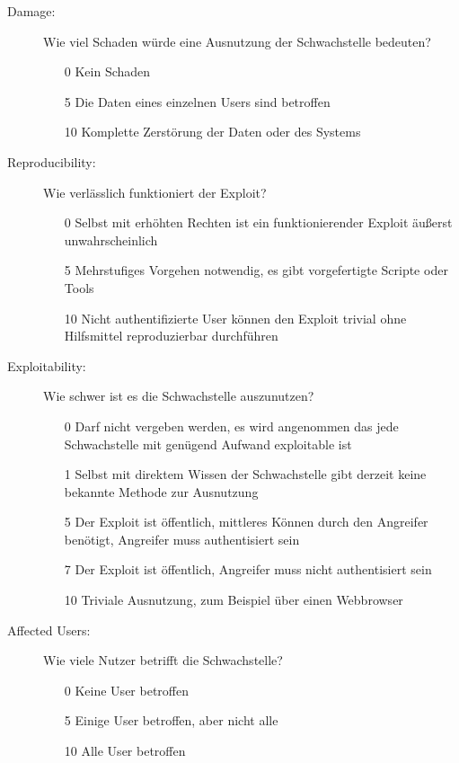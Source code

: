 		\begin{description}
			\item[Damage: ] Wie viel Schaden würde eine Ausnutzung der Schwachstelle bedeuten?
			\begin{itemize}
				\item[0] Kein Schaden
				\item[5] Die Daten eines einzelnen Users sind betroffen
				\item[10] Komplette Zerstörung der Daten oder des Systems 
			\end{itemize}
			
			\item[Reproducibility: ] Wie verlässlich funktioniert der Exploit?
			\begin{itemize}
				\item[0] Selbst mit erhöhten Rechten ist ein funktionierender Exploit äußerst unwahrscheinlich
				\item[5] Mehrstufiges Vorgehen notwendig, es gibt vorgefertigte Scripte oder Tools
				\item[10] Nicht authentifizierte User können den Exploit trivial ohne Hilfsmittel reproduzierbar durchführen
			\end{itemize}
			
			\item[Exploitability: ] Wie schwer ist es die Schwachstelle auszunutzen?
			\begin{itemize}
				\item[0] Darf nicht vergeben werden, es wird angenommen das jede Schwachstelle mit genügend Aufwand exploitable ist
				\item[1] Selbst mit direktem Wissen der Schwachstelle gibt derzeit keine bekannte Methode zur Ausnutzung
				\item[5] Der Exploit ist öffentlich, mittleres Können durch den Angreifer benötigt, Angreifer muss authentisiert sein
				\item[7] Der Exploit ist öffentlich, Angreifer muss nicht authentisiert sein
				\item[10] Triviale Ausnutzung, zum Beispiel über einen Webbrowser
			\end{itemize}
			
			\item[Affected Users: ] Wie viele Nutzer betrifft die Schwachstelle?
			\begin{itemize}
				\item[0] Keine User betroffen
				\item[5] Einige User betroffen, aber nicht alle
				\item[10] Alle User betroffen
			\end{itemize}
			

\end{description}
